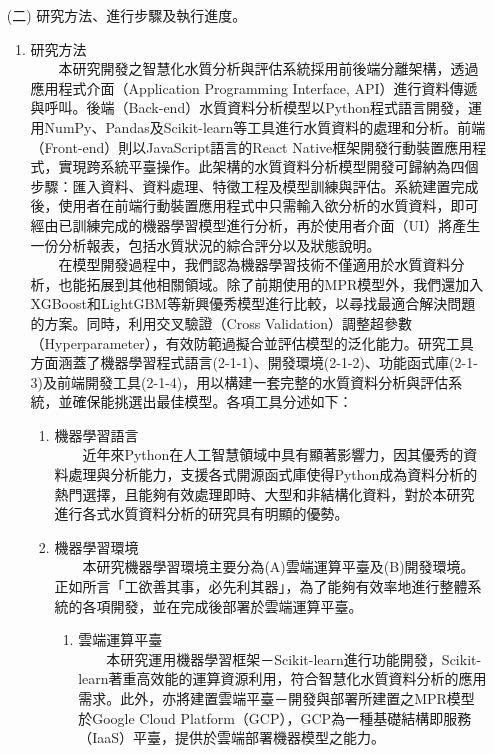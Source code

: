 \documentclass[12pt,a4paper]{article}
\begin{document}
\begin{enumerate}
\item[(二)] 研究方法、進行步驟及執行進度。
\begin{enumerate}[label=\arabic*.]
\item 研究方法\\
　　本研究開發之智慧化水質分析與評估系統採用前後端分離架構，透過應用程式介面（Application Programming Interface, API）進行資料傳遞與呼叫。後端（Back-end）水質資料分析模型以Python程式語言開發，運用NumPy、Pandas及Scikit-learn等工具進行水質資料的處理和分析。前端（Front-end）則以JavaScript語言的React Native框架開發行動裝置應用程式，實現跨系統平臺操作。此架構的水質資料分析模型開發可歸納為四個步驟：匯入資料、資料處理、特徵工程及模型訓練與評估。系統建置完成後，使用者在前端行動裝置應用程式中只需輸入欲分析的水質資料，即可經由已訓練完成的機器學習模型進行分析，再於使用者介面（UI）將產生一份分析報表，包括水質狀況的綜合評分以及狀態說明。\\
　　在模型開發過程中，我們認為機器學習技術不僅適用於水質資料分析，也能拓展到其他相關領域。除了前期使用的MPR模型外，我們還加入XGBoost和LightGBM等新興優秀模型進行比較，以尋找最適合解決問題的方案。同時，利用交叉驗證（Cross Validation）調整超參數（Hyperparameter），有效防範過擬合並評估模型的泛化能力\cite{ref11}。研究工具方面涵蓋了機器學習程式語言(2-1-1)、開發環境(2-1-2)、功能函式庫(2-1-3)及前端開發工具(2-1-4)，用以構建一套完整的水質資料分析與評估系統，並確保能挑選出最佳模型。各項工具分述如下：
    \begin{enumerate}[label=2-1-\arabic*.]
        \item 機器學習語言\\
        　　近年來Python在人工智慧領域中具有顯著影響力，因其優秀的資料處理與分析能力，支援各式開源函式庫使得Python成為資料分析的熱門選擇\cite{ref12}，且能夠有效處理即時、大型和非結構化資料\cite{ref13}，對於本研究進行各式水質資料分析的研究具有明顯的優勢。
        \item 機器學習環境\\
        　　本研究機器學習環境主要分為(A)雲端運算平臺及(B)開發環境。正如所言「工欲善其事，必先利其器」，為了能夠有效率地進行整體系統的各項開發，並在完成後部署於雲端運算平臺。 
                    \begin{enumerate}[label=\Alph*.]
                        \item 雲端運算平臺\\
                        　　本研究運用機器學習框架－Scikit-learn進行功能開發，Scikit-learn著重高效能的運算資源利用，符合智慧化水質資料分析的應用需求。此外，亦將建置雲端平臺－開發與部署所建置之MPR模型於Google Cloud Platform（GCP），GCP為一種基礎結構即服務（IaaS）平臺，提供於雲端部署機器模型之能力。 

\end{enumerate}
\end{enumerate}
\end{enumerate}
\end{enumerate}
\end{document}
